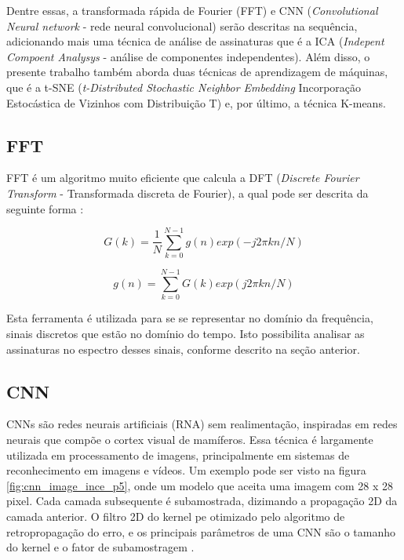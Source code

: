 Dentre essas, a transformada rápida de Fourier (FFT) e CNN (\textit{Convolutional Neural network} - rede neural convolucional) 
serão descritas na sequência, adicionando mais uma técnica de análise de assinaturas que é a ICA (\textit{Indepent Compoent Analysys}
 - análise de componentes independentes). Além disso, o presente trabalho também aborda duas técnicas de aprendizagem de máquinas, que 
 é a t-SNE (\textit{t-Distributed Stochastic Neighbor Embedding} Incorporação Estocástica de Vizinhos com Distribuição T) e, por último, 
 a técnica K-means.


% 

\subsection{FFT}

FFT é um algoritmo muito eficiente que calcula a DFT (\textit{Discrete Fourier Transform} - Transformada discreta de Fourier), a qual 
pode ser descrita da seguinte forma \cite{Wu2013}:

\begin{equation}\label{eq:dft}
    G(k)=\frac{1}{N}\sum_{k=0}^{N-1} g(n)exp(-j2\pi kn/N)
\end{equation}

\begin{equation}\label{eq:dft}
    g(n)=\sum_{k=0}^{N-1} G(k)exp(j2\pi kn/N)
\end{equation}

Esta ferramenta é utilizada para se se representar no domínio da frequência, sinais discretos que estão no domínio do tempo. Isto 
possibilita analisar as assinaturas no espectro desses sinais, conforme descrito na seção anterior.


% 

\subsection{CNN}

CNNs são redes neurais artificiais (RNA) sem realimentação, inspiradas em redes neurais que compõe o cortex visual de mamíferos. Essa
técnica é largamente utilizada em processamento de imagens, principalmente em sistemas de reconhecimento em imagens e vídeos. Um exemplo
pode ser visto na figura \ref{fig:cnn_image_ince_p5}, onde um modelo que aceita uma imagem com 28 x 28 pixel. Cada camada subsequente é
subamostrada, dizimando a propagação 2D da camada anterior. O filtro 2D do kernel pe otimizado pelo algoritmo de retropropagação do erro, 
e os principais parâmetros de uma CNN são o tamanho do kernel e o fator de subamostragem \cite{Ince2016}.

